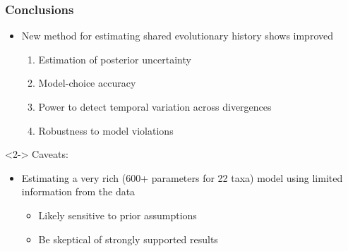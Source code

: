 \begin{frame}
    \frametitle{Conclusions}
    \begin{itemize}
        \item<1-> New method for estimating shared evolutionary history shows
            improved
        \begin{enumerate}
            \item Estimation of posterior uncertainty
            \item Model-choice accuracy
            \item Power to detect temporal variation across divergences
            \item Robustness to model violations
        \end{enumerate}

    \end{itemize}

    \begin{uncoverenv}<2->
    \bigskip
    Caveats:\\
    \begin{itemize}
            \item<1-> Estimating a very rich (600+ parameters for 22 taxa) model
                using limited information from the data
    
            \begin{itemize}
                \item Likely sensitive to prior assumptions
                \item Be skeptical of strongly supported results
            \end{itemize}
    
        \end{itemize}
    \end{uncoverenv}
\end{frame}

